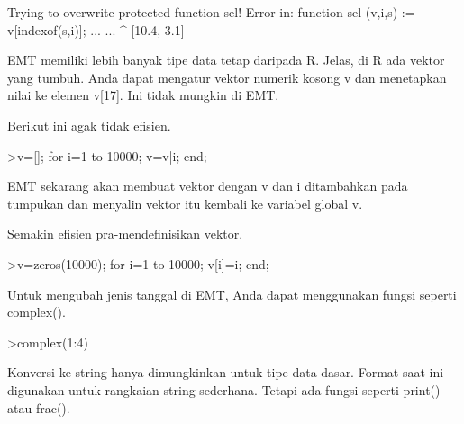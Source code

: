 \documentclass{article}
\begin{document}
\begin{eulernotebook}
\begin{eulercomment}
\begin{eulercomment}
\begin{euleroutput}
  Trying to overwrite protected function sel!
  Error in:
  function sel (v,i,s) := v[indexof(s,i)]; ... ...
               ^
  [10.4,  3.1]
  
\end{euleroutput}
\begin{eulercomment}
EMT memiliki lebih banyak tipe data tetap daripada R. Jelas, di R ada
vektor yang tumbuh. Anda dapat mengatur vektor numerik kosong v dan
menetapkan nilai ke elemen v[17]. Ini tidak mungkin di EMT.

Berikut ini agak tidak efisien.
\end{eulercomment}
\begin{eulerprompt}
>v=[]; for i=1 to 10000; v=v|i; end;
\end{eulerprompt}
\begin{eulercomment}
EMT sekarang akan membuat vektor dengan v dan i ditambahkan pada
tumpukan dan menyalin vektor itu kembali ke variabel global v.

Semakin efisien pra-mendefinisikan vektor.
\end{eulercomment}
\begin{eulerprompt}
>v=zeros(10000); for i=1 to 10000; v[i]=i; end;
\end{eulerprompt}
\begin{eulercomment}
Untuk mengubah jenis tanggal di EMT, Anda dapat menggunakan fungsi
seperti complex().
\end{eulercomment}
\begin{eulerprompt}
>complex(1:4)
\end{eulerprompt}
\begin{euleroutput}
  [ 1+0i ,  2+0i ,  3+0i ,  4+0i  ]
\end{euleroutput}
\begin{eulercomment}
Konversi ke string hanya dimungkinkan untuk tipe data dasar. Format
saat ini digunakan untuk rangkaian string sederhana. Tetapi ada fungsi
seperti print() atau frac().


\end{eulercomment}
\end{eulercomment}
\end{eulercomment}
\end{eulernotebook}
\end{document}
